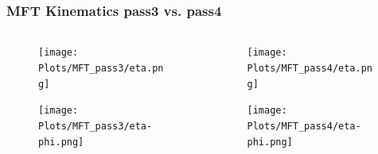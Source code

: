 \documentclass[11pt]{beamer}
\begin{document}
\begin{frame}
    \frametitle{MFT Kinematics pass3 vs. pass4}

    \begin{columns}[c]
        \begin{column}{0.5\textwidth}
            \begin{figure}
                \begin{center}
                    \texttt{[image: Plots/MFT\_pass3/eta.png]}
                \end{center}
            \end{figure}
            \begin{figure}
                \begin{center}
                    \texttt{[image: Plots/MFT\_pass3/eta-phi.png]}
                \end{center}
            \end{figure}
        \end{column}

        \begin{column}{0.5\textwidth}
            \begin{figure}
                \begin{center}
                    \texttt{[image: Plots/MFT\_pass4/eta.png]}
                \end{center}
            \end{figure}
            \begin{figure}
                \begin{center}
                    \texttt{[image: Plots/MFT\_pass4/eta-phi.png]}
                \end{center}
            \end{figure}
        \end{column}
    \end{columns}

\end{frame}
\end{document}
